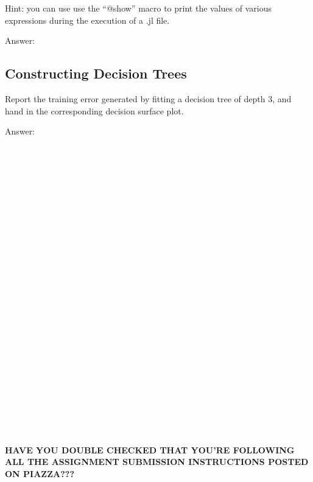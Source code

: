 \documentclass{article}
\def\ans#1{\par\gre{Answer: #1}}
\def\blu#1{{\color{blu}#1}}
\def\gre#1{{\color{gre}#1}}
\begin{document}
Hint: you can use use the ``@show'' macro to print the values of various expressions during the execution of a .jl file.

\ans{}

\pagebreak

\subsection{Constructing Decision Trees}

\blu{Report the training error generated by fitting a decision tree of depth 3, and hand in the corresponding decision surface plot.}

\ans{\\\\\\\\\\\\\\\\\\\\\\\\\\\\\\\\\\\\\\\\\\\\\\\\\\\\}

\vspace{25pt}
\textbf{HAVE YOU DOUBLE CHECKED THAT YOU'RE FOLLOWING ALL THE ASSIGNMENT SUBMISSION INSTRUCTIONS POSTED ON PIAZZA???}
\end{document}
